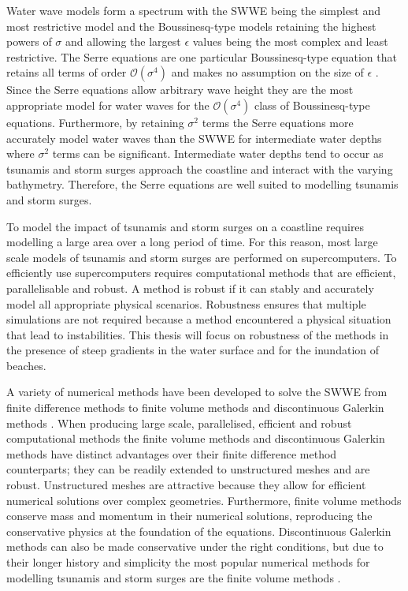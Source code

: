 Water wave models form a spectrum with the SWWE being the simplest and most restrictive model and the Boussinesq-type models retaining the highest powers of $\sigma$ and allowing the largest $\epsilon$ values being the most complex and least restrictive. The Serre equations are one particular Boussinesq-type equation that retains all terms of order $\mathcal{O}\left(\sigma ^4\right)$ and makes no assumption on the size of $\epsilon$ \cite{Bonneton-Lannes-2009-16601}. Since the Serre equations allow arbitrary wave height they are the most appropriate model for water waves for the $\mathcal{O}\left(\sigma ^4\right)$ class of Boussinesq-type equations. Furthermore, by retaining $\sigma^2$ terms the Serre equations more accurately model water waves than the SWWE for intermediate water depths where $\sigma^2$ terms can be significant. Intermediate water depths tend to occur as tsunamis and storm surges approach the coastline and interact with the varying bathymetry. Therefore, the Serre equations are well suited to modelling tsunamis and storm surges. 

To model the impact of tsunamis and storm surges on a coastline requires modelling a large area over a long period of time. For this reason, most large scale models of tsunamis and storm surges are performed on supercomputers. To efficiently use supercomputers requires computational methods that are efficient, parallelisable and robust. A method is robust if it can stably and accurately model all appropriate physical scenarios. Robustness ensures that multiple simulations are not required because a method encountered a physical situation that lead to instabilities. This thesis will focus on robustness of the methods in the presence of steep gradients in the water surface and for the inundation of beaches.  

A variety of numerical methods have been developed to solve the SWWE from finite difference methods \cite{Comcot} to finite volume methods \cite{ClawPack,ANUGA} and discontinuous Galerkin methods \cite{Eskilsson}. When producing large scale, parallelised, efficient and robust computational methods the finite volume methods and discontinuous Galerkin methods have distinct advantages over their finite difference method counterparts; they can be readily extended to unstructured meshes and are robust. Unstructured meshes are attractive because they allow for efficient numerical solutions over complex geometries. Furthermore, finite volume methods conserve mass and momentum in their numerical solutions, reproducing the conservative physics at the foundation of the equations. Discontinuous Galerkin methods can also be made conservative under the right conditions, but due to their longer history and simplicity the most popular numerical methods for modelling tsunamis and storm surges are the finite volume methods \cite{ClawPack,ANUGA}.

